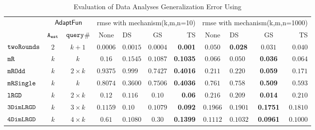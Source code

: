 {\footnotesize
\begin {table}[t]
        \vspace{-0.5cm}
        \caption{Evaluation of Data Analyses Generalization Error Using {\THESYSTEM}}
    \vspace{-0.4cm}
        \label{tb:adapt-generalization}
        \begin{center}
        \centering
{
        \begin{tabular}{|| >{\tiny}l || c | c || c | l | c | r || c | l | c | r || }
                \hhline{t|:=========== :t:|}
        \multirow{2}{*}{Program $c$}
         & \multicolumn{2}{c||}{$\textsf{AdaptFun}$}
         & \multicolumn{4}{c||}{rmse with mechanism(k,m,n=10)}  & \multicolumn{4}{c||}{rmse with mechanism(k,m,n=1000)}  \\ 
         \hhline{||~--||----||----||}
         & {${\mathtt{A_{est}}}$ } & {${\tt query}$\# }  & None  & DS & GS & TS & None & DS & GS & TS \\ 
         \hline \hline
        $  \mathtt{ twoRounds }$ & $ 2 $ & $  k + 1 $  & $0.0006$   & {{$0.0015$}} & $0.0004$ & \textbf{0.001}& $0.050$   & {\textbf{0.028}} & {$0.031$} & $0.040$  \\
        \hhline{||-||---||-||--||----||}
         $  \mathtt{ mR}$ & $k$ & $k$  & $0.16$   & $0.1545$  & $0.1087 $ & \textbf{0.1035}  & $0.066$   & $0.050$ & {\textbf{0.036}} & $0.064$  \\
         \hhline{||-||---||-||--||----||}
         $  \mathtt{ mROdd }$ & $ k $   & $  2 \times k $ & $0.9375$   & $0.999$ & $0.7427$ & {\textbf{0.4016}} & $0.211$   & $0.220$ & {\textbf{0.059}} & $0.171$  \\
         \hhline{||-||---||-||--||----||}
         $  \mathtt{ mRSingle }$ & $ k $ & $  k $  & $0.8074$   & $0.3600$ & $ 0.7506$ & {\textbf{0.4036}} & $ 0.761$   & $ 0.758$ & {\textbf{0.509}} & $ 0.593$  \\
         \hhline{||-||---||-||--||----||}
         $  \mathtt{ lRGD }$ & $ k $ & $  2\times k $  & $0.12$   & $0.116$ & $ 0.10 $ & \textbf{0.06} & $0.216$   & $0.209$ & \textbf{0.014} & $0.210$  \\
         \hhline{||-||---||-||--||----||}
         $  \mathtt{ 3DimLRGD }$ & $ k $ & $  3\times k $  & $0.1159$   & $0.10$ & $0.1079$ & \textbf{0.092} & $0.1966$   & $0.1901$ & \textbf{0.1751} & $0.1810$  \\
         \hhline{||-||---||-||--||----||}
         $  \mathtt{ 4DimLRGD }$ & $ k $ & $  4\times k $   & $0.61$   & $0.1080$ & $0.30 $ & \textbf{0.1399} & $0.1112$   & $0.1032$ & \textbf{0.0961} & $0.1000$  \\

\end{tabular}}
\end{center}
\end{table}}
